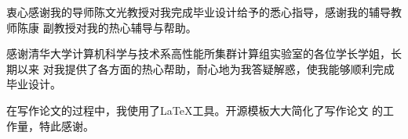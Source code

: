 \begin{ack}
衷心感谢我的导师陈文光教授对我完成毕业设计给予的悉心指导，感谢我的辅导教师陈康
副教授对我的热心辅导与帮助。

感谢清华大学计算机科学与技术系高性能所集群计算组实验室的各位学长学姐，长期以来
对我提供了各方面的热心帮助，耐心地为我答疑解惑，使我能够顺利完成毕业设计。

在写作论文的过程中，我使用了\LaTeX 工具。开源模板\thuthesis 大大简化了写作论文
的工作量，特此感谢。
\end{ack}
